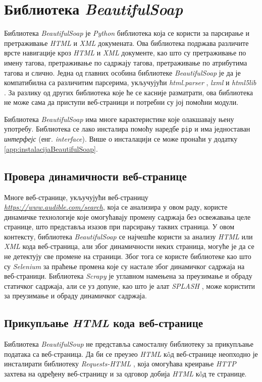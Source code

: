 \documentclass[12pt,oneside]{memoir}
\begin{document}
\section{Библиотека \textit{BeautifulSoap}}
\label{chp:beaufiulSoap}
Библиотека \textit{BeautifulSoap} \cite{beautifulSoapDocs} је \textit{Python} библиотека која се користи за парсирање и претраживање \textit{HTML} и \textit{XML} докумената. Ова библиотека подржава различите врсте навигације кроз \textit{HTML} и \textit{XML} документе, као што су претраживање по имену тагова, претраживање по садржају тагова, претраживање по атрибутима тагова и слично.
Једна од главних особина библиотеке \textit{BeautifulSoap} је да је компатибилна са различитим парсерима, укључујући \textit{html.parser} \cite{htmlParser}, \textit{lxml} \cite{lxmlParser} и \textit{html5lib} \cite{html5lib}. За разлику од других библиотека које ће се касније разматрати, ова библиотека не може сама да приступи веб-страници и потребни су јој помоћни модули. 

Библиотека \textit{BeautifulSoap} има многе карактеристике које олакшавају њену употребу. Библиотека се лако инсталира помоћу наредбе \texttt{pip} и има једноставан \emph{интерфејс} (енг. \textit{interface}). Више о инсталацији се може пронаћи у додатку \ref{app:instalacijaBeautifulSoap}.

\subsection{Провера динамичности веб-странице}
Многе веб-странице, укључујући веб-страницу \\ \textit{\href{https://www.audible.com/search}{{https://www.audible.com/search}}}, која се анализира у овом раду, користе динамичке технологије које омогућавају промену садржаја без освежавања целе странице, што представља изазов при парсирању таквих страница. У овом контексту, библиотека \textit{BeautifulSoap} се најчешће користи за анализу \textit{HTML} или \textit{XML} кода веб-страница, али због динамичности неких страница, могуће је да се не детектују све промене на страници. Због тога се користе библиотеке као што су \textit{Selenium} \cite{selenium} за праћење промена које су настале због динамичког садржаја на веб-страници. Библиотека \textit{Scrapy} \cite{scrapy} је углавном намењена за преузимање и обраду статичког садржаја, али се уз допуне, као што је алат \textit{SPLASH} \cite{splashDocs}, може користити за преузимање и обраду динамичког садржаја.

\subsection{Прикупљање \textit{HTML} кода веб-странице}
Библиотека \textit{BeautifulSoup} не представља самосталну библиотеку за прикупљање података са веб-страница. Да би се преузео \textit{HTML} кôд веб-странице неопходно је инсталирати библиотеку \textit{Requests-HTML} \cite{requestsDocs}, која омогућава креирање \textit{HTTP} захтева на одређену веб-страницу и за одговор добија \textit{HTML} кôд те странице. 
\end{document}
